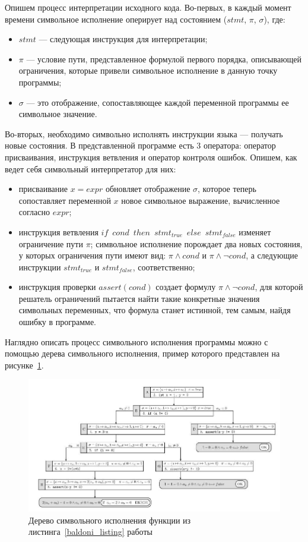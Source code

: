 Опишем процесс интерпретации исходного кода.
Во-первых, в каждый момент времени символьное исполнение оперирует над состоянием ($stmt$, $\pi$, $\sigma$), где:
\begin{itemize}
    \item $stmt$ --- следующая инструкция для интерпретации;
    \item $\pi$ --- условие пути, представленное формулой первого порядка, описывающей ограничения, которые привели символьное исполнение в данную точку программы;
    \item $\sigma$ --- это отображение, сопоставляющее каждой переменной программы ее символьное значение.
\end{itemize}
Во-вторых, необходимо символьно исполнять инструкции языка --- получать новые состояния. 
В представленной программе есть 3 оператора: оператор присваивания, инструкция ветвления и оператор контроля ошибок. 
Опишем, как ведет себя символьный интерпретатор для них:
\begin{itemize}
    \item присваивание $x = expr$ обновляет отображение $\sigma$, которое теперь сопоставляет переменной $x$ новое символьное выражение, вычисленное согласно $expr$;
    \item инструкция ветвления $if$~$cond$~$then$~$stmt_{true}$~$else$~$stmt_{false}$ изменяет ограничение пути $\pi$; символьное исполнение порождает два новых состояния, у которых ограничения пути имеют вид: $\pi \land cond$ и $\pi \land \neg cond$, а следующие инструкции $stmt_{true}$ и $stmt_{false}$, соответственно;
    \item инструкция проверки $assert(cond)$ создает формулу $\pi \land \neg cond$, для которой решатель ограничений пытается найти такие конкретные значения символьных переменных, что формула  станет истинной, тем самым, найдя ошибку в программе.
\end{itemize}

Наглядно описать процесс символьного исполнения программы можно с помощью дерева символьного исполнения, пример которого представлен на рисунке~\ref{exec-tree}.

\begin{figure}
\centering
\includegraphics[scale=0.7,angle =270]{Batoev/images/sym_ex_tree.jpg}
\caption{Дерево символьного исполнения функции из листинга~\ref{baldoni_listing} работы~\cite{baldoni2018survey}}
\label{exec-tree}
\end{figure}

